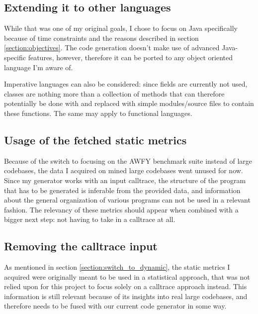\documentclass[12pt]{article}
\begin{document}
\subsection{Extending it to other languages}
While that was one of my original goals, I chose to focus on Java specifically because of time constraints and the reasons described in section \ref{section:objectives}. The code generation doesn't make use of advanced Java-specific features, however, therefore it can be ported to any object oriented language I'm aware of. 

Imperative languages can also be considered: since fields are currently not used, classes are nothing more than a collection of methods that can therefore potentially be done with and replaced with simple modules/source files to contain these functions. The same may apply to functional languages.


\subsection{Usage of the fetched static metrics}
Because of the switch to focusing on the AWFY benchmark suite instead of large codebases, the data I acquired on mined large codebases went unused for now. Since my generator works with an input calltrace, the structure of the program that has to be generated is inferable from the provided data, and information about the general organization of various programs can not be used in a relevant fashion. The relevancy of these metrics should appear when combined with a bigger next step: not having to take in a calltrace at all.

\subsection{Removing the calltrace input}
As mentioned in section \ref{section:switch_to_dynamic}, the static metrics I acquired were originally meant to be used in a statistical approach, that was not relied upon for this project to focus solely on a calltrace approach instead. This information is still relevant because of its insights into real large codebases, and therefore needs to be fused with our current code generator in some way. 
\end{document}
